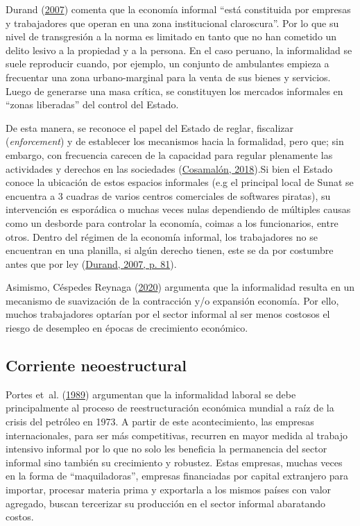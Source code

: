 \documentclass[
  letterpaper,
  12pt,
  oneside,
  spanish,
  doublespacing,
  headsepline,
  parskip]{MastersDoctoralThesis}
\begin{document}
Durand (\protect\hyperlink{ref-durand2007}{2007}) comenta que la
economía informal ``está constituida por empresas y trabajadores que
operan en una zona institucional claroscura''. Por lo que su nivel de
transgresión a la norma es limitado en tanto que no han cometido un
delito lesivo a la propiedad y a la persona. En el caso peruano, la
informalidad se suele reproducir cuando, por ejemplo, un conjunto de
ambulantes empieza a frecuentar una zona urbano-marginal para la venta
de sus bienes y servicios. Luego de generarse una masa crítica, se
constituyen los mercados informales en ``zonas liberadas'' del control
del Estado.

De esta manera, se reconoce el papel del Estado de reglar, fiscalizar
(\emph{enforcement}) y de establecer los mecanismos hacia la formalidad,
pero que; sin embargo, con frecuencia carecen de la capacidad para
regular plenamente las actividades y derechos en las sociedades
(\protect\hyperlink{ref-cosamaluxf3n2018}{Cosamalón, 2018}).Si bien el
Estado conoce la ubicación de estos espacios informales (e.g el
principal local de Sunat se encuentra a 3 cuadras de varios centros
comerciales de softwares piratas), su intervención es esporádica o
muchas veces nulas dependiendo de múltiples causas como un desborde para
controlar la economía, coimas a los funcionarios, entre otros. Dentro
del régimen de la economía informal, los trabajadores no se encuentran
en una planilla, si algún derecho tienen, este se da por costumbre antes
que por ley (\protect\hyperlink{ref-durand2007}{Durand, 2007, p. 81}).

Asimismo, Céspedes Reynaga
(\protect\hyperlink{ref-cuxe9spedesreynaga2020}{2020}) argumenta que la
informalidad resulta en un mecanismo de suavización de la contracción
y/o expansión economía. Por ello, muchos trabajadores optarían por el
sector informal al ser menos costosos el riesgo de desempleo en épocas
de crecimiento económico.

\hypertarget{corriente-neoestructural}{%
\subsection{Corriente neoestructural}\label{corriente-neoestructural}}

Portes et~al. (\protect\hyperlink{ref-theinfo1989}{1989}) argumentan que
la informalidad laboral se debe principalmente al proceso de
reestructuración económica mundial a raíz de la crisis del petróleo en
1973. A partir de este acontecimiento, las empresas internacionales,
para ser más competitivas, recurren en mayor medida al trabajo intensivo
informal por lo que no solo les beneficia la permanencia del sector
informal sino también su crecimiento y robustez. Estas empresas, muchas
veces en la forma de ``maquiladoras'', empresas financiadas por capital
extranjero para importar, procesar materia prima y exportarla a los
mismos países con valor agregado, buscan tercerizar su producción en el
sector informal abaratando costos.
\end{document}
